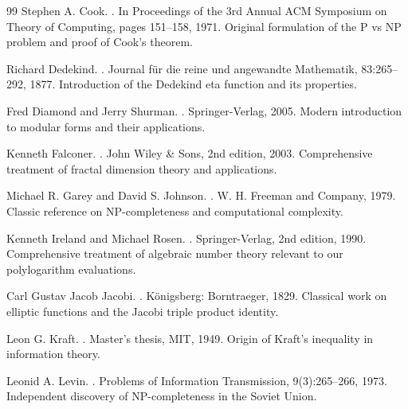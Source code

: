 \documentclass[12pt]{article}
\theoremstyle{plain}
\theoremstyle{definition}
\begin{document}
\begin{thebibliography}{99}
Stephen A. Cook.
.
\newblock In Proceedings of the 3rd Annual ACM Symposium on Theory of Computing, pages 151--158, 1971.
\newblock Original formulation of the P vs NP problem and proof of Cook's theorem.

Richard Dedekind.
.
\newblock Journal für die reine und angewandte Mathematik, 83:265--292, 1877.
\newblock Introduction of the Dedekind eta function and its properties.

Fred Diamond and Jerry Shurman.
.
\newblock Springer-Verlag, 2005.
\newblock Modern introduction to modular forms and their applications.

Kenneth Falconer.
.
\newblock John Wiley \& Sons, 2nd edition, 2003.
\newblock Comprehensive treatment of fractal dimension theory and applications.

Michael R. Garey and David S. Johnson.
.
\newblock W. H. Freeman and Company, 1979.
\newblock Classic reference on NP-completeness and computational complexity.

Kenneth Ireland and Michael Rosen.
.
\newblock Springer-Verlag, 2nd edition, 1990.
\newblock Comprehensive treatment of algebraic number theory relevant to our polylogarithm evaluations.

Carl Gustav Jacob Jacobi.
.
\newblock Königsberg: Borntraeger, 1829.
\newblock Classical work on elliptic functions and the Jacobi triple product identity.

Leon G. Kraft.
.
\newblock Master's thesis, MIT, 1949.
\newblock Origin of Kraft's inequality in information theory.

Leonid A. Levin.
.
\newblock Problems of Information Transmission, 9(3):265--266, 1973.
\newblock Independent discovery of NP-completeness in the Soviet Union.


\end{thebibliography}
\end{document}
